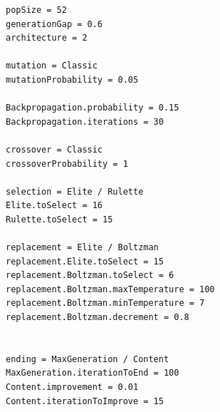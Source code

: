 \documentclass{sig-alternate}
\begin{document}
\newpage
\begin{lstlisting}[caption={Archivo de configuración simple},label={code:simple}]
popSize = 52
generationGap = 0.6
architecture = 2

mutation = Classic
mutationProbability = 0.05

Backpropagation.probability = 0.15
Backpropagation.iterations = 30

crossover = Classic
crossoverProbability = 1

selection = Elite / Rulette
Elite.toSelect = 16
Rulette.toSelect = 15

replacement = Elite / Boltzman
replacement.Elite.toSelect = 15
replacement.Boltzman.toSelect = 6
replacement.Boltzman.maxTemperature = 100
replacement.Boltzman.minTemperature = 7
replacement.Boltzman.decrement = 0.8


ending = MaxGeneration / Content
MaxGeneration.iterationToEnd = 100
Content.improvement = 0.01
Content.iterationToImprove = 15

\end{lstlisting}
\end{document}
